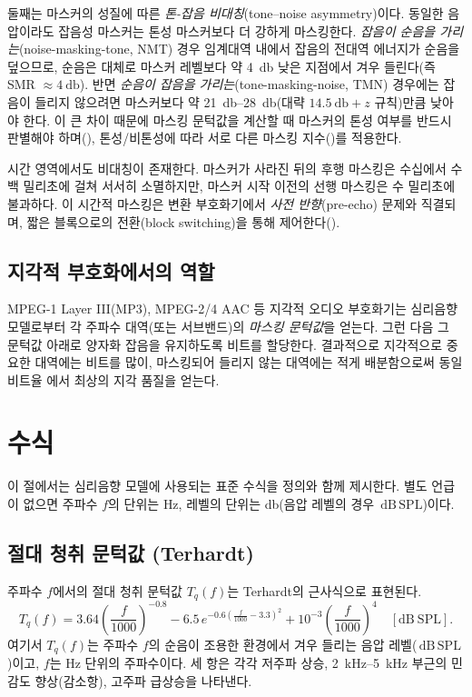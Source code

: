 \documentclass[11pt,a4paper]{article}
\newcommand{\dBSPL}{\ensuremath{\,\mathrm{dB\,SPL}}}  %
\newcommand{\ATH}{T_{q}}                               %
\begin{document}
둘째는 마스커의 성질에 따른 \emph{톤-잡음 비대칭}(tone--noise asymmetry)이다.
동일한 음압이라도 잡음성 마스커는 톤성 마스커보다 더 강하게 마스킹한다.
\emph{잡음이 순음을 가리는}(noise-masking-tone, NMT) 경우 임계대역 내에서 잡음의
전대역 에너지가 순음을 덮으므로, 순음은 대체로 마스커 레벨보다 약
\SI{4}{\decibel} 낮은 지점에서 겨우 들린다(즉 SMR $\approx \SI{4}{\decibel}$).
반면 \emph{순음이 잡음을 가리는}(tone-masking-noise, TMN) 경우에는 잡음이 들리지
않으려면 마스커보다 약 \SIrange{21}{28}{\decibel}(대략 $\SI{14.5}{\decibel} +
z$ 규칙)만큼 낮아야 한다. 이 큰 차이 때문에 마스킹 문턱값을 계산할 때 마스커의
톤성 여부를 반드시 판별해야 하며(), 톤성/비톤성에 따라 서로 다른
마스킹 지수()를 적용한다.

시간 영역에서도 비대칭이 존재한다. 마스커가 사라진 뒤의 후행 마스킹은 수십에서
수백 밀리초에 걸쳐 서서히 소멸하지만, 마스커 시작 이전의 선행 마스킹은 수 밀리초에
불과하다. 이 시간적 마스킹은 변환 부호화기에서 \emph{사전 반향}(pre-echo) 문제와
직결되며, 짧은 블록으로의 전환(block switching)을 통해 제어한다().

\subsection{지각적 부호화에서의 역할}
MPEG-1 Layer III(MP3), MPEG-2/4 AAC 등 지각적 오디오 부호화기는 심리음향 모델로부터
각 주파수 대역(또는 서브밴드)의 \emph{마스킹 문턱값}을 얻는다. 그런 다음 그 문턱값
아래로 양자화 잡음을 유지하도록 비트를 할당한다. 결과적으로 지각적으로 중요한
대역에는 비트를 많이, 마스킹되어 들리지 않는 대역에는 적게 배분함으로써 동일 비트율
에서 최상의 지각 품질을 얻는다.

\section{수식}\label{sec:math}
이 절에서는 심리음향 모델에 사용되는 표준 수식을 정의와 함께 제시한다. 별도 언급이
없으면 주파수 $f$의 단위는 \si{\hertz}, 레벨의 단위는 \si{\decibel}(음압 레벨의 경우
\dBSPL)이다.

\subsection{절대 청취 문턱값 (Terhardt)}
주파수 $f$에서의 절대 청취 문턱값 $\ATH(f)$는 Terhardt의 근사식으로 표현된다.
\begin{equation}\label{eq:ath}
  \ATH(f) = 3.64\left(\frac{f}{1000}\right)^{-0.8}
          - 6.5\, e^{-0.6\left(\frac{f}{1000} - 3.3\right)^{2}}
          + 10^{-3}\left(\frac{f}{1000}\right)^{4}
  \quad [\mathrm{dB\ SPL}].
\end{equation}
여기서 $\ATH(f)$는 주파수 $f$의 순음이 조용한 환경에서 겨우 들리는 음압
레벨(\dBSPL)이고, $f$는 \si{\hertz} 단위의 주파수이다. 세 항은 각각 저주파 상승,
\SIrange{2}{5}{\kilo\hertz} 부근의 민감도 향상(감소항), 고주파 급상승을 나타낸다.
\end{document}
